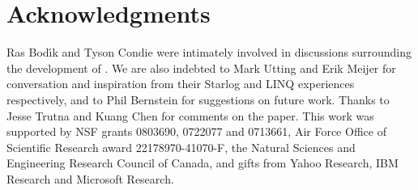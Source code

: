 \section{Acknowledgments}
Ras Bod\'{\i}k and Tyson Condie were intimately involved in discussions
surrounding the development of \lang.  We are also indebted to Mark Utting and
Erik Meijer for conversation and inspiration from their Starlog and LINQ
experiences respectively, and to Phil Bernstein for suggestions on future work.
Thanks to Jesse Trutna and Kuang Chen for comments on the paper. This work was
supported by NSF grants 0803690, 0722077 and 0713661, Air Force Office of
Scientific Research award 22178970-41070-F, the Natural Sciences and
Engineering Research Council of Canada, and gifts from Yahoo Research, IBM
Research and Microsoft Research.
